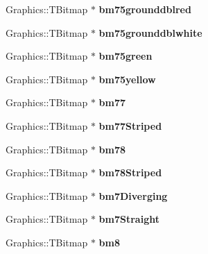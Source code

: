 \begin{DoxyCompactItemize}
Graphics\+::\+T\+Bitmap $\ast$ {\bfseries bm75grounddblred}
\item 
\mbox{\label{class_t_rail_graphics_a01089db2728a4fe39268855e673f5688}} 
Graphics\+::\+T\+Bitmap $\ast$ {\bfseries bm75grounddblwhite}
\item 
\mbox{\label{class_t_rail_graphics_a5041c90f8bfae8193971131ceadfae47}} 
Graphics\+::\+T\+Bitmap $\ast$ {\bfseries bm75green}
\item 
\mbox{\label{class_t_rail_graphics_a9ae041f6f6b97693d992d6c02fff5e07}} 
Graphics\+::\+T\+Bitmap $\ast$ {\bfseries bm75yellow}
\item 
\mbox{\label{class_t_rail_graphics_ae2ebb672f6ac8c0fef9ad80dac97203f}} 
Graphics\+::\+T\+Bitmap $\ast$ {\bfseries bm77}
\item 
\mbox{\label{class_t_rail_graphics_a72037ed8d9592492e352b0d6089358cd}} 
Graphics\+::\+T\+Bitmap $\ast$ {\bfseries bm77\+Striped}
\item 
\mbox{\label{class_t_rail_graphics_a91e96f5e836d78b31528a15d927d81e0}} 
Graphics\+::\+T\+Bitmap $\ast$ {\bfseries bm78}
\item 
\mbox{\label{class_t_rail_graphics_a33d09a0eac78c2a891338db19f653676}} 
Graphics\+::\+T\+Bitmap $\ast$ {\bfseries bm78\+Striped}
\item 
\mbox{\label{class_t_rail_graphics_ada3c7f466fb10259388f00c82f5f8fa4}} 
Graphics\+::\+T\+Bitmap $\ast$ {\bfseries bm7\+Diverging}
\item 
\mbox{\label{class_t_rail_graphics_a5f307120547ff85709c53238ba4ce21e}} 
Graphics\+::\+T\+Bitmap $\ast$ {\bfseries bm7\+Straight}
\item 
\mbox{\label{class_t_rail_graphics_aecbc7d450d97cd26eb256dcf8d701aec}} 
Graphics\+::\+T\+Bitmap $\ast$ {\bfseries bm8}
\item 
\mbox{\label{class_t_rail_graphics_a7482dc878242ed9ddc2cb0f3c1f21108}} 

\end{DoxyCompactItemize}
